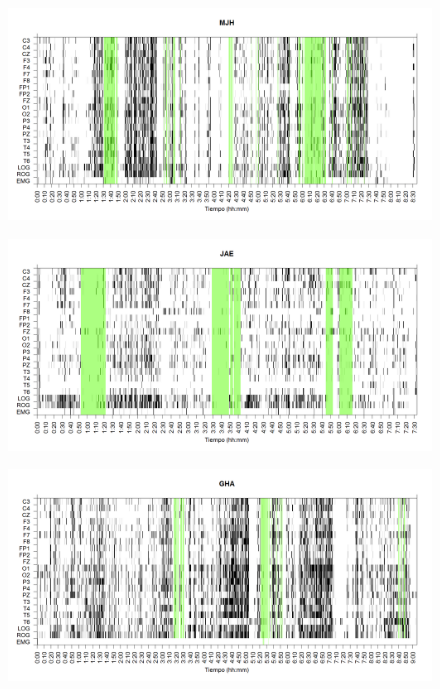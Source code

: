 \documentclass[12pt,a4paper]{mitthesis}
\begin{document}
\begin{figure}
\centering
\includegraphics[width=0.9\linewidth]
{./g170413/MJNNVIGILOS_est.png} 
\label{grf_MJH}
\end{figure}


\begin{figure}
\centering
\includegraphics[width=0.9\linewidth]
{./g170413/JANASUE_est.png} 
\label{grf_JAE}
\end{figure}


\begin{figure}
\centering
\includegraphics[width=0.9\linewidth]
{./g170413/GH24031950SUENNO_est.png} 
\label{grf_GHA}
\end{figure}
\end{document}
